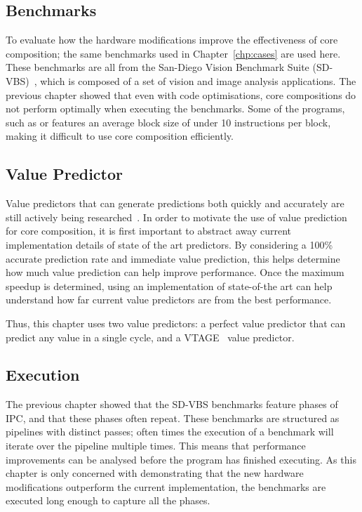\subsection{Benchmarks}

To evaluate how the hardware modifications improve the effectiveness of core composition; the same benchmarks used in Chapter~\ref{chp:cases} are used here.
These benchmarks are all from the San-Diego Vision Benchmark Suite (SD-VBS)~\cite{sdvbs}, which is composed of a set of vision and image analysis applications.
The previous chapter showed that even with code optimisations, core compositions do not perform optimally when executing the benchmarks.
Some of the programs, such as  or  features an average block size of under 10 instructions per block, making it difficult to use core composition efficiently.

\subsection{Value Predictor}
Value predictors that can generate predictions both quickly and accurately are still actively being researched~\cite{peraisVTAGE2014,sheikh2017value}.
In order to motivate the use of value prediction for core composition, it is first important to abstract away current implementation details of state of the art predictors.
By considering a 100\% accurate prediction rate and immediate value prediction, this helps determine how much value prediction can help improve performance.
Once the maximum speedup is determined, using an implementation of state-of-the art can help understand how far current value predictors are from the best performance.

Thus, this chapter uses two value predictors: a perfect value predictor that  can predict any value in a single cycle, and a VTAGE~\cite{peraisVTAGE2014} value predictor.

\subsection{Execution} The previous chapter showed that the SD-VBS benchmarks feature phases of IPC, and that these phases often repeat.
These benchmarks are structured as pipelines with distinct passes; often times the execution of a benchmark will iterate over the pipeline multiple times.
This means that performance improvements can be analysed before the program has finished executing.
As this chapter is only concerned with demonstrating that the new hardware modifications outperform the current implementation, the benchmarks are executed long enough to capture all the phases.



